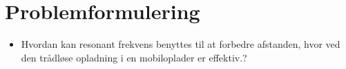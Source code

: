 \section{Problemformulering}

\begin{itemize}

\item Hvordan kan resonant frekvens benyttes til at forbedre afstanden, hvor ved den trådløse opladning i en mobiloplader er effektiv.?

\end{itemize}
